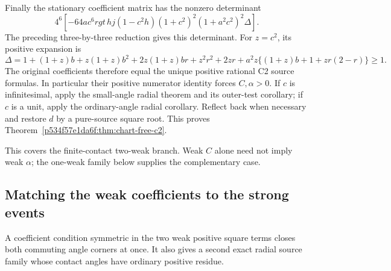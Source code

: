 Finally the stationary coefficient matrix has the nonzero determinant
\[
4^6[-64ac^6rgt\,hj(1-c^2h)(1+c^2)^2(1+a^2c^2)^2\Delta].
\]
The preceding three-by-three reduction gives this determinant.
For \(z=c^2\), its positive expansion is
\[
\Delta=1+(1+z)b+z(1+z)b^2+2z(1+z)br+z^2r^2+2zr
       +a^2z\{(1+z)b+1+zr(2-r)\}\ge1.
\]
The original coefficients
therefore equal the unique positive rational C2 source formulas.
In particular their positive numerator identity forces \(C,\alpha>0\).
If \(c\) is infinitesimal, apply the small-angle radial theorem and its
outer-test corollary; if \(c\) is a unit, apply the ordinary-angle radial
corollary. Reflect back when necessary and restore \(d\) by a pure-source
square root. This proves Theorem~\ref{p534f57e1da6f:thm:chart-free-c2}.

This covers the finite-contact two-weak branch. Weak \(C\) alone need
not imply weak \(\alpha\); the one-weak family below supplies the
complementary case.

\subsection{Matching the weak coefficients to the strong events}
\label{component:p8b53b68d8af6}

\label{p8b53b68d8af6:sec:c2-matching-strength}

A coefficient condition symmetric in the two weak positive square terms closes both
commuting angle corners at once.  It also gives a second exact radial
source family whose contact angles have ordinary positive residue.

